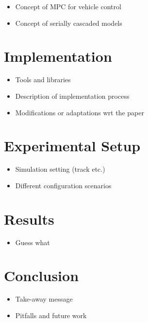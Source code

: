 \documentclass[a4paper, twocolumn, 11pt, twoside]{article}
\begin{document}
\begin{itemize}
    \item Concept of MPC for vehicle control
    \item Concept of serially cascaded models
\end{itemize}

\section{Implementation}

\begin{itemize}
    \item Tools and libraries
    \item Description of implementation process
    \item Modifications or adaptations wrt the paper
\end{itemize}

\section{Experimental Setup}

\begin{itemize}
    \item Simulation setting (track etc.)
    \item Different configuration scenarios
\end{itemize}

\section{Results}

\begin{itemize}
    \item Guess what
\end{itemize}

\section{Conclusion}

\begin{itemize}
    \item Take-away message
    \item Pitfalls and future work
\end{itemize}



\end{document}
